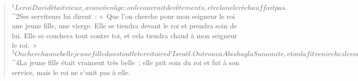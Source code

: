   
  
    
      
         
      \bchapter{}
      \begin{verse}
${}^{1}Le roi David était vieux, avancé en âge ; on le couvrait de vêtements, et cela ne le réchauffait pas. 
${}^{2}Ses serviteurs lui dirent : « Que l’on cherche pour mon seigneur le roi une jeune fille, une vierge. Elle se tiendra devant le roi et prendra soin de lui. Elle se couchera tout contre toi, et cela tiendra chaud à mon seigneur le roi. » 
${}^{3}On chercha une belle jeune fille dans tout le territoire d’Israël. On trouva Abishag la Sunamite, et on la fit venir chez le roi. 
${}^{4}La jeune fille était vraiment très belle ; elle prit soin du roi et fut à son service, mais le roi ne s’unit pas à elle.
      

\end{verse}
